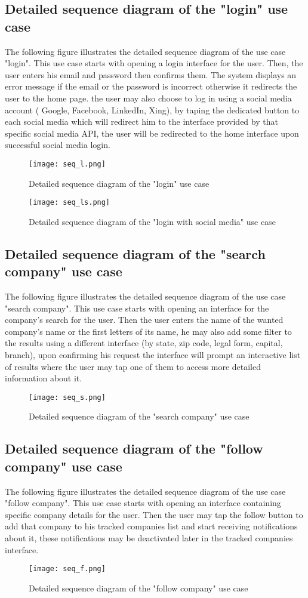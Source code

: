 \subsection{Detailed sequence diagram of the "login" use case}
The following figure illustrates the detailed sequence diagram of the use case
"login".
This use case starts with opening a login interface
for the user. Then, the user enters his email and password then confirms them.
The system displays an error message if the email or the password is incorrect otherwise it redirects
the user to the home page.
the user may also choose to log in using a social media account ( Google, Facebook, LinkedIn, Xing), by taping the dedicated button to each social media which will redirect him to the interface provided by that specific social media API, the user will be redirected to the home interface upon successful social media login.
  \begin{figure}[H]%
    \center   
    \texttt{[image: seq\_l.png]}
    \caption{Detailed sequence diagram of the "login" use case}
\end{figure}
\begin{figure}[H]%
    \center   
    \texttt{[image: seq\_ls.png]}
    \caption{Detailed sequence diagram of the "login with social media" use case}
\end{figure}
\subsection{Detailed sequence diagram of the "search company" use case}
The following figure illustrates the detailed sequence diagram of the use case
"search company".
This use case starts with opening an interface for the company's search for the user. Then the user enters the name of the wanted company's name or the first letters of its name, he may also add some filter to the results using a different interface (by state, zip code, legal form, capital, branch), upon confirming his request the interface will prompt an interactive list of results where the user may tap one of them to access more detailed information about it.
 \begin{figure}[H]%
    \center   
    \texttt{[image: seq\_s.png]}
    \caption{Detailed sequence diagram of the "search company" use case}
\end{figure}

\subsection{Detailed sequence diagram of the "follow company" use case}
The following figure illustrates the detailed sequence diagram of the use case
"follow company".
This use case starts with opening an interface containing specific company details for the user. Then the user may tap the follow button to add that company to his tracked companies list and start receiving notifications about it, these notifications may be deactivated later in the tracked companies interface.
\begin{figure}[H]%
    \center   
    \texttt{[image: seq\_f.png]}
    \caption{Detailed sequence diagram of the "follow company" use case}
\end{figure}
